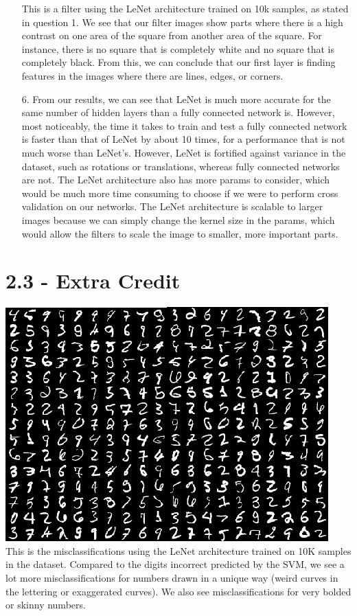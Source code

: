 \documentclass[11pt]{article}
\begin{document}
\begin{itemize}
This is a filter using the LeNet architecture trained on 10k samples, as stated in question 1. We see that our filter images show parts where there is a high contrast on one area of the square from another area of the square. For instance, there is no square that is completely white and no square that is completely black. From this, we can conclude that our first layer is finding features in the images where there are lines, edges, or corners. 
\item[6.] From our results, we can see that LeNet is much more accurate for the same number of hidden layers than a fully connected network is. However, most noticeably, the time it takes to train and test a fully connected network is faster than that of LeNet by about 10 times, for a performance that is not much worse than LeNet's. However, LeNet is fortified against variance in the dataset, such as rotations or translations, whereas fully connected networks are not. The LeNet architecture also has more params to consider, which would be much more time consuming to choose if we were to perform cross validation on our networks. The LeNet architecture is scalable to larger images because we can simply change the kernel size in the params, which would allow the filters to scale the image to smaller, more important parts.
\end{itemize}
\newpage
\section*{2.3 - Extra Credit} 
\includegraphics[scale=0.7]{diagrams/lenetmisclass.png}\\
This is the misclassifications using the LeNet architecture trained on 10K samples in the dataset. Compared to the digits incorrect predicted by the SVM, we see a lot more misclassifications for numbers drawn in a unique way (weird curves in the lettering or exaggerated curves). We also see misclassifications for very bolded or skinny numbers.
\newpage
\end{document}
